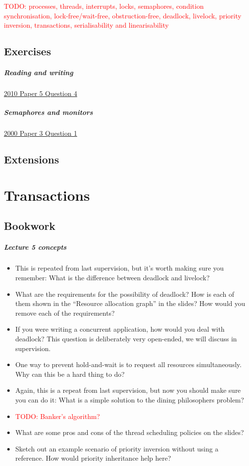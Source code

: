 \documentclass[12pt,a4paper,oneside,openright]{report}
\newcommand{\question}[2]{\paragraph{#1} #2}
\newcommand{\todo}[1]{\textcolor{red}{TODO: #1}}
\begin{document}
\todo{processes, threads, interrupts, locks, semaphores, condition
  synchronisation, lock-free/wait-free, obstruction-free, deadlock,
  livelock, priority inversion, transactions, serialisability and
  linearisability}

\section{Exercises}

\question{Reading and
  writing}{\href{https://www.cl.cam.ac.uk/teaching/exams/pastpapers/y2010p5q4.pdf}{2010
    Paper 5 Question 4}}

\question{Semaphores and
  monitors}{\href{https://www.cl.cam.ac.uk/teaching/exams/pastpapers/y2000p3q1.pdf}{2000
    Paper 3 Question 1}}

\section{Extensions}


\chapter{Transactions}

\section{Bookwork}

\question{Lecture 5 concepts}{
  \begin{itemize}
  \item This is repeated from last supervision, but it's worth making
    sure you remember: What is the difference between deadlock and
    livelock?
  \item What are the requirements for the possibility of deadlock? How
    is each of them shown in the ``Resource allocation graph'' in the
    slides? How would you remove each of the requirements?
  \item If you were writing a concurrent application, how would you
    deal with deadlock? This question is deliberately very open-ended,
    we will discuss in supervision.
  \item One way to prevent hold-and-wait is to request all resources
    simultaneously. Why can this be a hard thing to do?
  \item Again, this is a repeat from last supervision, but now you
    should make sure you can do it: What is a simple solution to the
    dining philosophers problem?
  \item \todo{Banker's algorithm?}
  \item What are some pros and cons of the thread scheduling policies
    on the slides?
  \item Sketch out an example scenario of priority inversion without
    using a reference. How would priority inheritance help here?
  \end{itemize}
}
\end{document}
